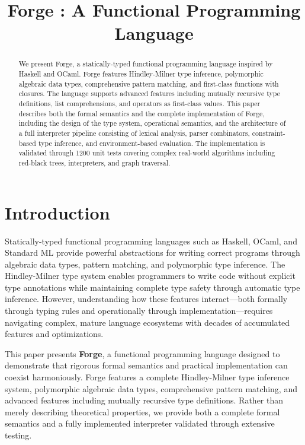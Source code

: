 \documentclass[conference,onecolumn]{IEEEtran}
\begin{document}
\title{Forge : A Functional Programming Language}

\author{
}

\maketitle

\begin{abstract}
We present Forge, a statically-typed functional programming language inspired by Haskell and OCaml. Forge features Hindley-Milner type inference, polymorphic algebraic data types, comprehensive pattern matching, and first-class functions with closures. The language supports advanced features including mutually recursive type definitions, list comprehensions, and operators as first-class values. This paper describes both the formal semantics and the complete implementation of Forge, including the design of the type system, operational semantics, and the architecture of a full interpreter pipeline consisting of lexical analysis, parser combinators, constraint-based type inference, and environment-based evaluation. The implementation is validated through 1200 unit tests covering complex real-world algorithms including red-black trees, interpreters, and graph traversal.
\end{abstract}

\tableofcontents

\newpage
\section{Introduction}

Statically-typed functional programming languages such as Haskell, OCaml, and Standard ML provide powerful abstractions for writing correct programs through algebraic data types, pattern matching, and polymorphic type inference. The Hindley-Milner type system enables programmers to write code without explicit type annotations while maintaining complete type safety through automatic type inference. However, understanding how these features interact---both formally through typing rules and operationally through implementation---requires navigating complex, mature language ecosystems with decades of accumulated features and optimizations.

This paper presents \textbf{Forge}, a functional programming language designed to demonstrate that rigorous formal semantics and practical implementation can coexist harmoniously. Forge features a complete Hindley-Milner type inference system, polymorphic algebraic data types, comprehensive pattern matching, and advanced features including mutually recursive type definitions. Rather than merely describing theoretical properties, we provide both a complete formal semantics and a fully implemented interpreter validated through extensive testing.
\end{document}
